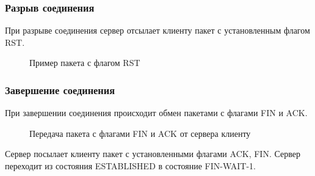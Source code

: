 \documentclass[a4paper, 14pt,russian]{article}
\begin{document}
	\subsubsection{Разрыв соединения}
		При разрыве соединения сервер отсылает клиенту пакет с установленным флагом RST.
		\newpage
		\begin{figure}[h!]
			\caption{Пример пакета с флагом RST}
			\label{img:tcp_reset}
		\end{figure}
	\newpage
	
	\subsubsection{Завершение соединения}
	При завершении соединения происходит обмен пакетами с флагами FIN и ACK.
	\begin{figure}[h!]
		\caption{Передача пакета с флагами FIN и ACK от сервера клиенту}
		\label{img:tcp_reset}
	\end{figure}
	Сервер посылает клиенту пакет с установленными флагами ACK, FIN. Сервер переходит из состояния ESTABLISHED в состояние FIN-WAIT-1.
\end{document}
